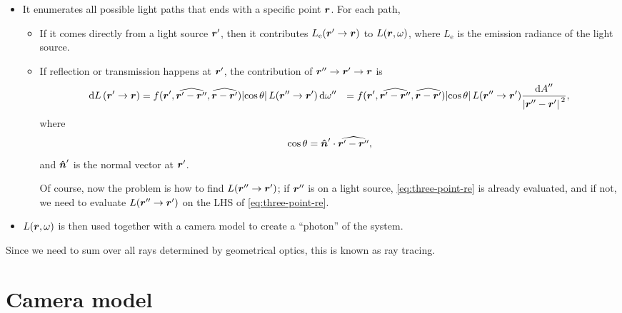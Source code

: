 \documentclass[hyperref, a4paper]{article}
\def\\{}%
\begin{document}
\begin{itemize}
        Since the radiance is conserved along a ray (Pharr et al. chap. 14),
        we can also use $L(\vb*{r} \to \vb*{r}')$ to refer to the radiance, 
        if we are able to find some $\vb*{r}$ and $\vb*{r}'$ on boundaries,%
        \footnote{
            Often we need to deal with lights from infinity,
            but at least in theory we can model ``infinity''
            by a large light source at a distance.
        }
        and $\widehat{\vb*{r}' - \vb*{r}} = \omega$.
        With this notation, the i and o subscripts are no longer necessary.
    \item It enumerates all possible light paths that ends with a specific point $\vb*{r}$.
        For each path, 
        \begin{itemize}
            \item If it comes directly from a light source $\vb*{r}'$, 
                then it contributes $L_{\text{e}}(\vb*{r}' \to \vb*{r})$ to $L(\vb*{r}, \omega)$,
                where $L_{\text{e}}$ is the emission radiance of the light source.
            \item If reflection or transmission happens at $\vb*{r}'$, 
                the contribution of $\vb*{r}'' \to \vb*{r}' \to \vb*{r}$ is 
                \begin{equation}
                    \begin{aligned}
                        \dd{L}(\vb*{r}' \to \vb*{r})
                        &= f(\vb*{r}', \widehat{\vb*{r}' - \vb*{r}''}, \widehat{\vb*{r} - \vb*{r}'})
                        \abs*{\cos \theta } L(\vb*{r}'' \to \vb*{r}') \dd{\omega''} \\
                        &= f(\vb*{r}', \widehat{\vb*{r}' - \vb*{r}''}, \widehat{\vb*{r} - \vb*{r}'})
                        \abs*{\cos \theta } L(\vb*{r}'' \to \vb*{r}')
                        \frac{\dd{A}''}{\abs*{\vb*{r}'' - \vb*{r}'}^2},
                    \end{aligned}
                    \label{eq:three-point-re}
                \end{equation} 
                where 
                \begin{equation}
                    \cos \theta = \vu*{n}' \cdot \widehat{\vb*{r}' - \vb*{r}''},
                \end{equation}
                and $\vu*{n}'$ is the normal vector at $\vb*{r}'$.
                
                Of course, now the problem is how to find $L(\vb*{r}'' \to \vb*{r}')$;
                if $\vb*{r}''$ is on a light source, 
                \eqref{eq:three-point-re} is already evaluated, 
                and if not, 
                we need to evaluate $L(\vb*{r}'' \to \vb*{r}')$
                on the LHS of \eqref{eq:three-point-re}.
        \end{itemize}
    \item $L(\vb*{r}, \omega)$ is then used together with a camera model 
        to create a ``photon'' of the system.
\end{itemize}
Since we need to sum over all rays determined by geometrical optics, 
this is known as ray tracing.

\section{Camera model}
\end{document}

